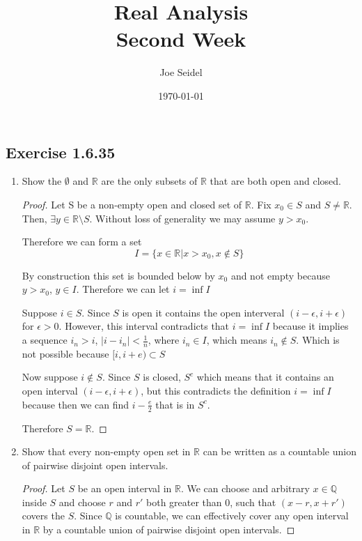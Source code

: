 \documentclass{tufte-book}
\title{Real Analysis\\Second Week }
\author{Joe Seidel}
\date{\today}
\theoremstyle{mytheoremstyle}
\theoremstyle{mylemstyle}
\theoremstyle{mydefstyle}
\begin{document}
\maketitle
{}
\newpage
{}

\subsection{Exercise 1.6.35}

\begin{enumerate}
\item Show the $\emptyset$ and $\mathbb{R}$ are the only subsets of $\mathbb{R}$ that are both open and closed.

\begin{proof}
Let S be a non-empty open and closed set of $\mathbb{R}$.  Fix $x_0 \in S$ and $S \neq \mathbb{R}$.  Then, $\exists y \in \mathbb{R} \setminus S$.  Without loss of generality we may assume $y > x_0$.

Therefore we can form a set
\[I = \{ x \in \mathbb{R} | x > x_0, x \notin S\}\]

By construction this set is bounded below by $x_0$ and not empty because $y > x_0$, $y \in I$.  Therefore we can let $i = \inf I$

Suppose $i \in S$.  Since $S$ is open it contains the open interveral $(i-\epsilon, i+\epsilon)$ for $\epsilon > 0$.  However, this interval contradicts that $i = \inf I$ because it implies a sequence $i_n > i$, $|i - i_n| < \frac{1}{n}$, where $i_n \in I$, which means $i_n \notin S$.  Which is not possible because $[i, i+e) \subset S$

Now suppose $i \notin S$.  Since $S$ is closed, $S^c$ which means that it contains an open interval $(i-\epsilon, i+\epsilon)$, but this contradicts the definition $i = \inf I$ because then we can find $i - \frac{e}{2}$ that is in $S^c$.

Therefore $S = \mathbb{R}$.
\end{proof}

\item Show that every non-empty open set in $\mathbb{R}$ can be written as a countable union of pairwise disjoint open intervals.

\begin{proof}

Let $S$ be an open interval in $\mathbb{R}$.  We can choose and arbitrary $x \in \mathbb{Q}$ inside $S$ and choose $r$ and $r'$ both greater than $0$, such that $(x-r, x+r')$ covers the $S$.  Since $\mathbb{Q}$ is countable, we can effectively cover any open interval in $\mathbb{R}$ by a countable union of pairwise disjoint open intervals.


\end{proof}
\end{enumerate}
\end{document}
